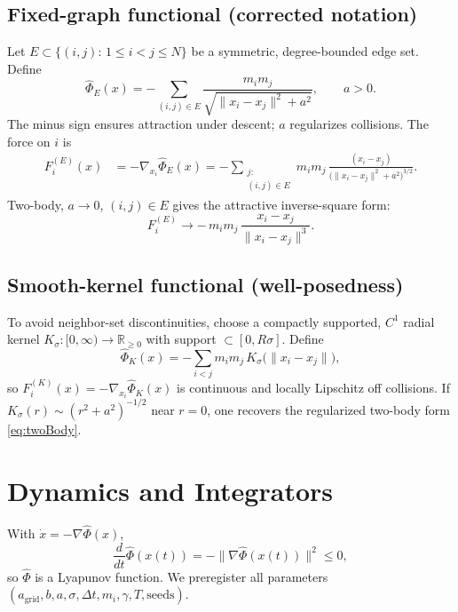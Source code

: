 \documentclass[11pt,a4paper]{article}
\numberwithin{equation}{section}
\newcommand{\R}{\mathbb{R}}
\begin{document}
\subsection{Fixed-graph functional (corrected notation)}
Let $E\subset\{(i,j):\,1\le i<j\le N\}$ be a symmetric, degree-bounded edge set. Define
\begin{equation}
\label{eq:phiE}
\widehat{\Phi}_E(x)= -\sum_{(i,j)\in E} \frac{m_im_j}{\sqrt{\lVert x_i-x_j\rVert^2+a^2}},\qquad a>0.
\end{equation}
The minus sign ensures attraction under descent; $a$ regularizes collisions. The force on $i$ is
\begin{align}
\label{eq:forceE}
F^{(E)}_i(x)
&= -\nabla_{x_i}\widehat{\Phi}_E(x)
= -\sum_{\substack{j:\\(i,j)\in E}}
m_im_j\,\frac{(x_i-x_j)}{\big(\lVert x_i-x_j\rVert^2+a^2\big)^{3/2}}.
\end{align}
Two-body, $a\to 0$, $(i,j)\in E$ gives the attractive inverse-square form:
\begin{equation}
\label{eq:twoBody}
F^{(E)}_i \to -\,m_im_j\,\frac{x_i-x_j}{\lVert x_i-x_j\rVert^3}.
\end{equation}

\subsection{Smooth-kernel functional (well-posedness)}
To avoid neighbor-set discontinuities, choose a compactly supported, $C^1$ radial kernel $K_\sigma:[0,\infty)\to\R_{\ge 0}$ with support $\subset[0,R\sigma]$. Define
\begin{equation}
\label{eq:phiK}
\widehat{\Phi}_K(x)= -\sum_{i<j} m_im_j\,K_\sigma\!\big(\lVert x_i-x_j\rVert\big),
\end{equation}
so $F^{(K)}_i(x)=-\nabla_{x_i}\widehat{\Phi}_K(x)$ is continuous and locally Lipschitz off collisions. If $K_\sigma(r)\sim (r^2+a^2)^{-1/2}$ near $r=0$, one recovers the regularized two-body form \eqref{eq:twoBody}.

\section{Dynamics and Integrators}
With $\dot x=-\nabla\widehat{\Phi}(x)$,
\begin{equation}
\frac{d}{dt}\widehat{\Phi}(x(t)) = -\lVert\nabla\widehat{\Phi}(x(t))\rVert^2 \le 0,
\end{equation}
so $\widehat{\Phi}$ is a Lyapunov function. We preregister all parameters $(a_{\text{grid}},b,a,\sigma,\Delta t,m_i,\gamma,T,\text{seeds})$.
\end{document}
